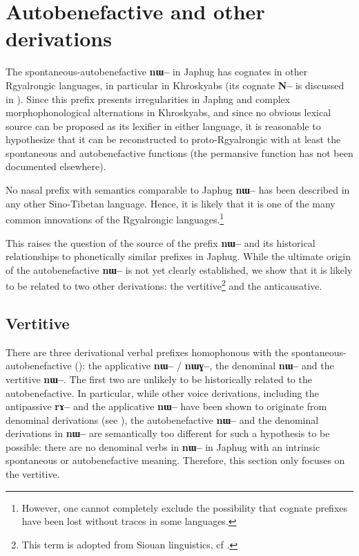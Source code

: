 \documentclass[oldfontcommands,oneside,a4paper,11pt]{article}
\newcommand{\ipa}[1]{\textbf{{\phon\mbox{#1}}}} %
\begin{document}
\section{Autobenefactive and other derivations}

The spontaneous-autobenefactive \ipa{nɯ--} in Japhug has cognates in other Rgyalrongic languages, in particular in Khroskyabs (its cognate \ipa{N--} is discussed in \citealt[157-160]{lai13affixale}). Since this prefix presents irregularities in Japhug and complex morphophonological alternations in Khroskyabs, and since no obvious lexical source can be proposed as its lexifier in either language, it is reasonable to hypothesize that it can be reconstructed to proto-Rgyalrongic with at least the spontaneous and autobenefactive functions (the permansive function has not been documented elsewhere).


No nasal prefix with semantics comparable to Japhug \ipa{nɯ--} has been described in any other Sino-Tibetan language. Hence, it is likely that it is one of the many common innovations of the Rgyalrongic languages.\footnote{However, one cannot completely exclude the possibility that cognate prefixes have been lost without traces in some languages.} 

This raises the question of the source of the prefix \ipa{nɯ--} and its historical relationships to phonetically similar prefixes in Japhug. While the ultimate origin of the autobenefactive \ipa{nɯ--} is not yet clearly established, we show that it is likely to be related to two other derivations: the vertitive\footnote{This term is adopted from Siouan linguistics, cf \citet{taylor76motion}.} and the anticausative.



\subsection{Vertitive}
There are three derivational verbal prefixes homophonous with the spontaneous-autobenefactive (\citealt{jacques13tropative}): the applicative \ipa{nɯ--} / \ipa{nɯɣ--}, the denominal \ipa{nɯ--} and the vertitive \ipa{nɯ--}. The first two are unlikely to be historically related to the autobenefactive. In particular, while other voice derivations, including the antipassive \ipa{rɤ--} and the applicative \ipa{nɯ--}  have been shown to originate from denominal derivations (see \citealt{jacques14antipassive}), the autobenefactive \ipa{nɯ--} and the denominal derivations in \ipa{nɯ--} are semantically too different for such a hypothesis to be possible: there are no denominal verbs in \ipa{nɯ--}  in Japhug with an intrinsic spontaneous or autobenefactive meaning. Therefore, this section only focuses on the vertitive.
\end{document}
